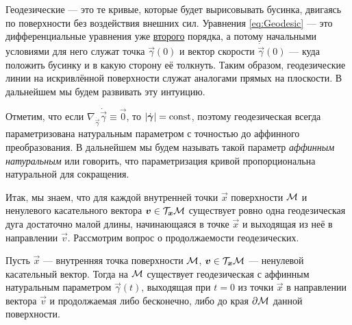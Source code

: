 Геодезические --- это те кривые, которые будет вырисовывать бусинка, двигаясь по поверхности без воздействия внешних сил. Уравнения \eqref{eq:Geodesic} --- это дифференциальные уравнения уже \underline{второго} порядка, а потому начальными условиями для него служат точка $\vec{\gamma}(0)$ и вектор скорости $\dot{\vec{\gamma}}(0)$ --- куда положить бусинку и в какую сторону её толкнуть. Таким образом, геодезические линии на искривлённой поверхности служат аналогами прямых на плоскости. В дальнейшем мы будем развивать эту интуицию.

Отметим, что если $\nabla_{\dot{\vec{\gamma}}}\dot{\vec{\gamma}} \equiv \vec{0}$, то $\left\lvert\dot{\boldsymbol{\gamma}}\right\rvert = \mathrm{const}$, поэтому геодезическая всегда параметризована натуральным параметром с точностью до аффинного преобразования. В дальнейшем мы будем называть такой параметр \textit{аффинным натуральным} или говорить, что параметризация кривой пропорциональна натуральной для сокращения.

Итак, мы знаем, что для каждой внутренней точки $\vec{x}$ поверхности $\mathcal{M}$ и ненулевого касательного вектора $\boldsymbol{v} \in \mathcal{T}_{\boldsymbol{x}}\mathcal{M}$ существует ровно одна геодезическая дуга достаточно малой длины, начинающаяся в точке $\vec{x}$ и выходящая из неё в направлении $\vec{v}$. Рассмотрим вопрос о продолжаемости геодезических.

\begin{theorem}
	Пусть $\vec{x}$ --- внутренняя точка поверхности $\mathcal{M}$, $\boldsymbol{v} \in \mathcal{T}_{\boldsymbol{x}}\mathcal{M}$ --- ненулевой касательный вектор. Тогда на $\mathcal{M}$ существует геодезическая с аффинным натуральным параметром $\vec{\gamma}(t)$, выходящая при $t = 0$ из точки $\vec{x}$ в направлении вектора $\vec{v}$ и продолжаемая либо бесконечно, либо до края $\partial\mathcal{M}$ данной поверхности.
\end{theorem}

